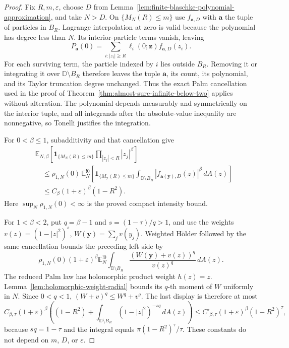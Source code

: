 \documentclass[11pt,a4paper]{article}
\numberwithin{equation}{section}
\theoremstyle{definition}
\theoremstyle{remark}
\newcommand{\D}{\mathbb D}
\newcommand{\E}{\mathbb E}
\begin{document}
\begin{proof}
Fix $R,m,\varepsilon$, choose $D$ from
Lemma~\ref{lem:finite-blaschke-polynomial-approximation}, and take
$N>D$. On $\{M_N(R)\le m\}$ use $f_{\mathbf a,D}$ with
$\mathbf a$ the tuple of particles in $B_R$. Lagrange interpolation
at zero is valid because the polynomial has degree less than $N$.
Its interior-particle terms vanish, leaving
\[
 P_{\mathbf a}(0)
 =\sum_{i:|z_i|\ge R}\ell_i(0;\mathbf z)
                                      f_{\mathbf a,D}(z_i).
\]
For each surviving term, the particle indexed by $i$ lies outside
$B_R$. Removing it or integrating it over $\D\setminus B_R$
therefore leaves the tuple $\mathbf a$, its count, its polynomial,
and its Taylor truncation degree unchanged. Thus the exact Palm
cancellation used in the proof of
Theorem~\ref{thm:almost-sure-infinite-below-two} applies without
alteration. The polynomial depends measurably and symmetrically on
the interior tuple, and all integrands after the absolute-value
inequality are nonnegative, so Tonelli justifies the integration.

For $0<\beta\le1$, subadditivity and that cancellation give
\begin{align*}
 &\E_{N,\beta}\left[
  \mathbf1_{\{M_N(R)\le m\}}
                      \prod_{|z_j|<R}|z_j|^\beta\right]\\
 &\quad\le\rho_{1,N}(0)\,
 \E_N^{!0}\left[\mathbf1_{\{M_{\mathbf y}(R)\le m\}}
   \int_{\D\setminus B_R}|f_{\mathbf a(\mathbf y),D}(z)|^\beta
                                            \,dA(z)\right]\\
 &\quad\le C_\beta(1+\varepsilon)^\beta(1-R^2).
\end{align*}
Here $\sup_N\rho_{1,N}(0)<\infty$ is the proved compact intensity
bound.

For $1<\beta<2$, put $q=\beta-1$ and
$s=(1-\tau)/q>1$, and use the weights
$v(z)=(1-|z|^2)^s$, $W(\mathbf y)=\sum_jv(y_j)$.
Weighted H\"older followed by the same cancellation bounds the
preceding left side by
\[
 \rho_{1,N}(0)(1+\varepsilon)^\beta
 \E_N^{!0}\int_{\D\setminus B_R}
                 \frac{(W(\mathbf y)+v(z))^q}{v(z)^q}\,dA(z).
\]
The reduced Palm law has holomorphic product weight $h(z)=z$.
Lemma~\ref{lem:holomorphic-weight-radial} bounds its $q$-th
moment of $W$ uniformly in $N$. Since $0<q<1$,
$(W+v)^q\le W^q+v^q$. The last display is therefore at most
\[
 C_{\beta,\tau}(1+\varepsilon)^\beta
 \left((1-R^2)+\int_{\D\setminus B_R}
                           (1-|z|^2)^{-sq}\,dA(z)\right)
 \le C'_{\beta,\tau}(1+\varepsilon)^\beta(1-R^2)^\tau,
\]
because $sq=1-\tau$ and the integral equals
$\pi(1-R^2)^\tau/\tau$. These constants do not depend on $m$,
$D$, or $\varepsilon$.


\end{proof}
\end{document}
